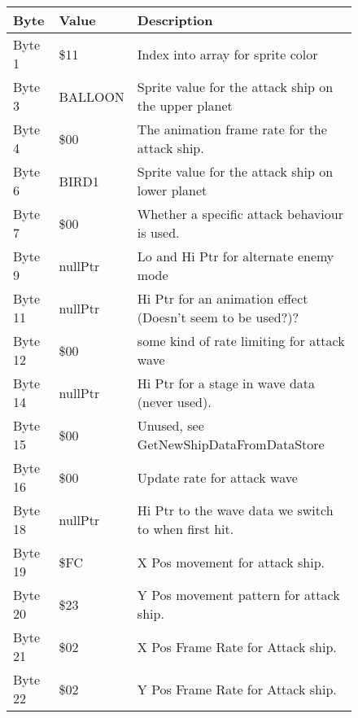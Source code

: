 \begin{figure}[H]
{\begin{adjustbox}{width=12cm}
\begin{tabular}{lll}
\toprule
 Byte    & Value                     & Description                                                        \\
\midrule
 Byte 1  & \$11                       & Index into array for sprite color                                  \\
 Byte 3  & BALLOON                   & Sprite value for the attack ship on the upper planet               \\
 Byte 4  & \$00                       & The animation frame rate for the attack ship.                      \\
 Byte 6  & BIRD1                     & Sprite value for the attack ship on lower planet                   \\
 Byte 7  & \$00                       & Whether a specific attack behaviour is used.                       \\
 Byte 9  & nullPtr                   & Lo and Hi Ptr for alternate enemy mode                             \\
 Byte 11 & nullPtr                   & Hi Ptr for an animation effect (Doesn't seem to be used?)?         \\
 Byte 12 & \$00                       & some kind of rate limiting for attack wave                         \\
 Byte 14 & nullPtr                   & Hi Ptr for a stage in wave data (never used).                      \\
 Byte 15 & \$00                       & Unused, see GetNewShipDataFromDataStore                            \\
 Byte 16 & \$00                       & Update rate for attack wave                                        \\
 Byte 18 & nullPtr                   & Hi Ptr to the wave data we switch to when first hit.               \\
 Byte 19 & \$FC                       & X Pos movement for attack ship.                                    \\
 Byte 20 & \$23                       & Y Pos movement pattern for attack ship.                            \\
 Byte 21 & \$02                       & X Pos Frame Rate for Attack ship.                                  \\
 Byte 22 & \$02                       & Y Pos Frame Rate for Attack ship.                                  \\

\end{tabular}
\end{adjustbox}}
\end{figure}

